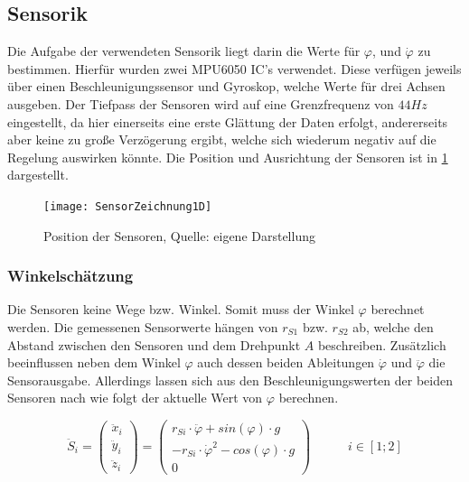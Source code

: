 \subsection{Sensorik}
\label{Sensorik_secd}
Die Aufgabe der verwendeten Sensorik liegt darin die Werte für $\varphi$, und $\dot{\varphi}$ zu bestimmen. Hierfür wurden zwei MPU6050 IC's verwendet. Diese verfügen jeweils über einen Beschleunigungssensor und Gyroskop, welche Werte für drei Achsen ausgeben. Der Tiefpass der Sensoren wird auf eine Grenzfrequenz von $44Hz$ eingestellt, da hier einerseits eine erste Glättung der Daten erfolgt, andererseits aber keine zu große Verzögerung ergibt, welche sich wiederum negativ auf die Regelung auswirken könnte. Die Position und Ausrichtung der Sensoren ist in \ref{Position_Sensoren_pic} dargestellt.

\begin{figure}[h]
\texttt{[image: SensorZeichnung1D]}
\caption{Position der Sensoren, Quelle: eigene Darstellung}

\label{Position_Sensoren_pic}
\end{figure}

\subsubsection{Winkelschätzung}
Die Sensoren keine Wege bzw. Winkel. Somit muss der Winkel $\varphi$ berechnet werden. Die gemessenen Sensorwerte hängen von $r_{S1}$ bzw. $r_{S2}$ ab, welche den Abstand zwischen den Sensoren und dem Drehpunkt $A$ beschreiben. Zusätzlich beeinflussen neben dem Winkel $\varphi$ auch dessen beiden Ableitungen $\dot{\varphi}$ und $\ddot{\varphi}$ die Sensorausgabe. Allerdings lassen sich aus den Beschleunigungswerten der beiden Sensoren nach \cite{Cubli1D} wie folgt der aktuelle Wert von $\varphi$ berechnen.

\begin{equation}
\ddot{S}_i = 
\begin{pmatrix}
\ddot{x}_i \\ \ddot{y}_i \\ \ddot{z}_i
\end{pmatrix} =
\begin{pmatrix}
r_{Si} \cdot \ddot{\varphi} + sin(\varphi) \cdot g \\
- r_{Si} \cdot \dot{\varphi}^2 - cos(\varphi) \cdot g \\
0
\end{pmatrix}
\hspace{35pt}
i \in [1;2]
\end{equation}

